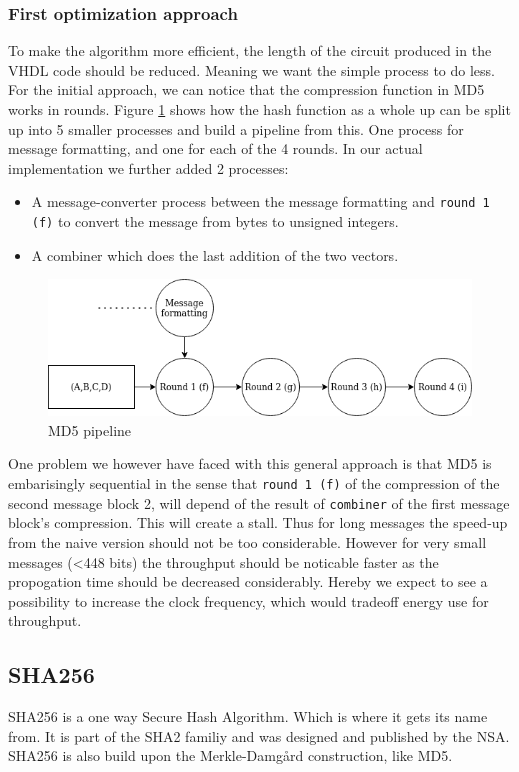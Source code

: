 \documentclass[a4paper]{article}
\begin{document}
\subsubsection{First optimization approach}
\label{sec:org1642614}
To make the algorithm more efficient, the length of the circuit produced in the VHDL code should be reduced. Meaning we want the simple process to do less. For the initial approach, we can notice that the compression function in MD5 works in rounds. Figure \ref{fig:MD5opt1} shows how the hash function as a whole up can be split up into 5 smaller processes and build a pipeline from this. One process for message formatting, and one for each of the 4 rounds. In our actual implementation we further added 2 processes:
\begin{itemize}
\item A message-converter process between the message formatting and \texttt{round 1 (f)} to convert the message from bytes to unsigned integers.
\item A combiner which does the last addition of the two vectors.
\end{itemize}

\begin{figure}[H]
\centering
\includegraphics[width=.9\linewidth]{./Implementation/md5.png}
\caption{\label{fig:MD5opt1}MD5 pipeline}
\end{figure}
One problem we however have faced with this general approach is that MD5 is embarisingly sequential in the sense that \texttt{round 1 (f)} of the compression of the second message block 2, will depend of the result of \texttt{combiner} of the first message block's compression. This will create a stall. Thus for long messages the speed-up from the naive version should not be too considerable. However for very small messages (<448 bits) the throughput should be noticable faster as the propogation time should be decreased considerably. Hereby we expect to see a possibility to increase the clock frequency, which would tradeoff energy use for throughput.
\subsection{SHA256}
\label{sec:org1618b18}
SHA256 is a one way Secure Hash Algorithm. Which is where it gets its name from.
It is part of the SHA2 familiy and was designed and published by the NSA.
SHA256 is also build upon the Merkle-Damgård construction, like MD5.
\end{document}
